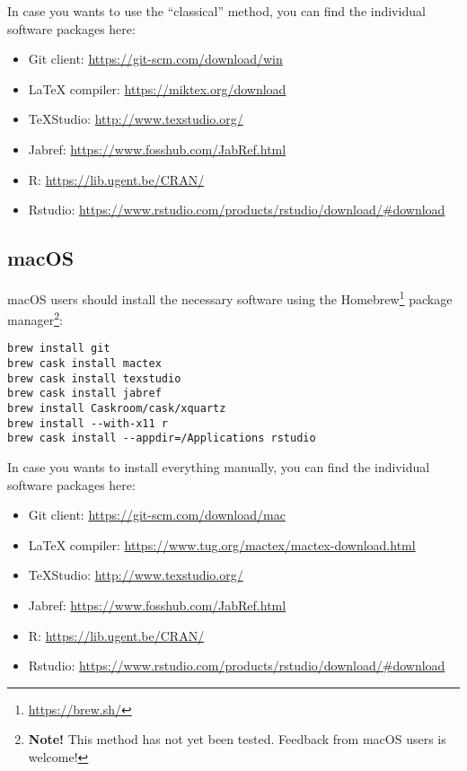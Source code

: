 In case you wants to use the ``classical'' method, you can find the individual software packages here:

\begin{itemize}
    \item Git client: \url{https://git-scm.com/download/win}
    \item \LaTeX{} compiler: \url{https://miktex.org/download}
    \item TeXStudio: \url{http://www.texstudio.org/}
    \item Jabref: \url{https://www.fosshub.com/JabRef.html}
    \item R: \url{https://lib.ugent.be/CRAN/}
    \item Rstudio: \url{https://www.rstudio.com/products/rstudio/download/#download}
\end{itemize}

\subsection{macOS}

macOS users should install the necessary software using the Homebrew\footnote{\url{https://brew.sh/}} package manager\footnote{\textbf{Note!} This method has not yet been tested. Feedback from macOS users is welcome!}:

\begin{verbatim}
brew install git
brew cask install mactex
brew cask install texstudio
brew cask install jabref
brew install Caskroom/cask/xquartz
brew install --with-x11 r
brew cask install --appdir=/Applications rstudio
\end{verbatim}

In case you wants to install everything manually, you can find the individual software packages here:

\begin{itemize}
    \item Git client: \url{https://git-scm.com/download/mac}
    \item \LaTeX{} compiler: \url{https://www.tug.org/mactex/mactex-download.html}
    \item TeXStudio: \url{http://www.texstudio.org/}
    \item Jabref: \url{https://www.fosshub.com/JabRef.html}
    \item R: \url{https://lib.ugent.be/CRAN/}
    \item Rstudio: \url{https://www.rstudio.com/products/rstudio/download/#download}
\end{itemize}


